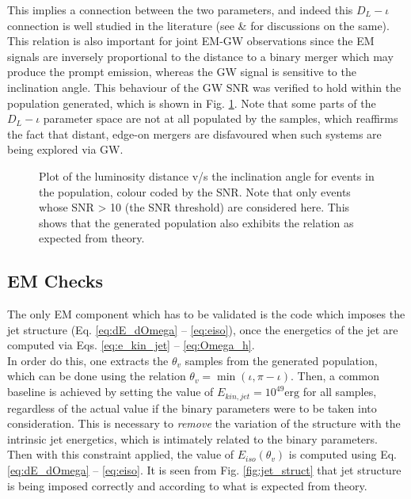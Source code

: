         This implies a connection between the two parameters, and indeed this $D_L-\iota
        $ connection is well studied in the literature (see \cite{schutz_2011} \&
        \cite{seto_2015} for discussions on the same). This relation is also important
        for joint EM-GW observations since the EM signals are inversely proportional to
        the distance to a binary merger which may produce the prompt emission, whereas
        the GW signal is sensitive to the inclination angle. This behaviour of the GW
        SNR was verified to hold within the population generated, which is shown in Fig.
        \ref{fig:dl_iota_correlation}. Note that some parts of the $D_L - \iota$
        parameter space are not at all populated by the samples, which reaffirms the
        fact that distant, edge-on mergers are disfavoured when such systems are being
        explored via GW.

        \begin{figure}[htpb]
            \centering
            \def\svgwidth{\linewidth}
            
            \caption[$D_L-\iota$ correlation in the population]{
                Plot of the luminosity distance v/s the inclination angle for events in
                the population, colour coded by the SNR. Note that only events whose SNR
                > 10 (the SNR threshold) are considered here.  This shows that the
                generated population also exhibits the relation as expected from theory.
            }
            \label{fig:dl_iota_correlation}
        \end{figure}

    \subsection{EM Checks}\label{sub:em_checks}

    The only EM component which has to be validated is the code which imposes the jet
    structure (Eq. \ref{eq:dE_dOmega} -- \ref{eq:eiso}), once the energetics of the jet
    are computed via Eqs. \ref{eq:e_kin_jet} -- \ref{eq:Omega_h}.\\
    In order do this, one extracts the $\theta_v$ samples from the generated population,
    which can be done using the relation $\theta_v = \min(\iota, \pi - \iota)$. Then, a
    common baseline is achieved by setting the value of $E_{kin, jet} = 10^{49} \text{
    erg}$ for all samples, regardless of the actual value if the binary parameters were
    to be taken into consideration. This is necessary to \emph{remove} the variation of
    the structure with the intrinsic jet energetics, which is intimately related to the
    binary parameters.\\
    Then with this constraint applied, the value of $E_{iso}(\theta_v)$ is computed
    using Eq.  \ref{eq:dE_dOmega} -- \ref{eq:eiso}. It is seen from Fig.
    \ref{fig:jet_struct} that jet structure is being imposed correctly and according to
    what is expected from theory.

